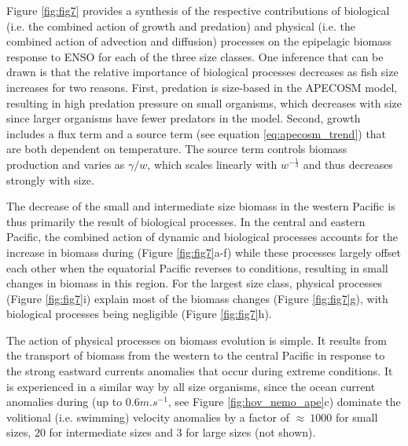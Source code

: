 Figure \ref{fig:fig7} provides a synthesis of the respective contributions of biological (i.e. the combined action of growth and predation) and physical (i.e. the combined action of advection and diffusion) processes on the epipelagic biomass response to ENSO for each of the three size classes. One inference that can be drawn is that the relative importance of biological processes decreases as fish size increases for two reasons. First, predation is size-based in the APECOSM model, resulting in high predation pressure on small organisms, which decreases with size since larger organisms have fewer predators in the model. Second, growth includes a flux term and a source term (see equation \ref{eq:apecosm_trend}) that are both dependent on temperature. The source term controls biomass production and varies as ${\gamma}/{w}$, which scales linearly with $w^{-\frac{1}{3}}$ and thus decreases strongly with size.

The decrease of the small and intermediate size biomass in the western Pacific is thus primarily the result of biological processes. In the central and eastern Pacific, the combined action of dynamic and biological processes accounts for the increase in biomass during \nino{} (Figure \ref{fig:fig7}a-f) while these processes largely offset each other when the equatorial Pacific reverses to \nina{} conditions, resulting in small  changes in biomass in this region. For the largest size class, physical processes (Figure \ref{fig:fig7}i) explain most of the biomass changes (Figure \ref{fig:fig7}g), with biological processes being negligible (Figure \ref{fig:fig7}h).

The action of physical processes on biomass evolution is simple. It results from the transport of biomass from the western to the central Pacific in response to the strong eastward currents anomalies that occur during extreme \nino{} conditions. It is experienced in a similar way by all size organisms, since the ocean current anomalies during \nino{} (up to $0.6 m.s^{-1}$, see Figure \ref{fig:hov_nemo_ape}c) dominate the volitional (i.e. swimming) velocity anomalies by a factor of $\approx\ 1000$ for small sizes, $20$ for intermediate sizes and $3$ for large sizes (not shown). 

